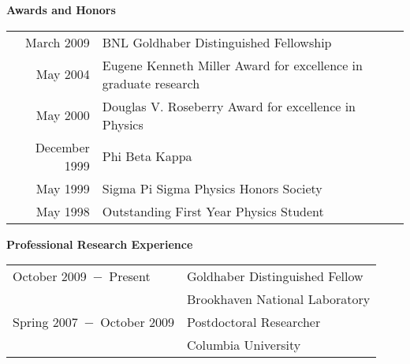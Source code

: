 \documentclass[12pt]{article}
\begin{document}
\noindent
{\Large \textbf{Awards and Honors}}

\begin{tabular}{rl}
March 2009			& BNL Goldhaber Distinguished Fellowship \\
May 2004				& Eugene Kenneth Miller Award for excellence in graduate research \\
May 2000				& Douglas V. Roseberry Award for excellence in Physics \\
December 1999	 	& Phi Beta Kappa  \\
May 1999				& Sigma Pi Sigma Physics Honors Society \\
May 1998				& Outstanding First Year Physics Student \\
\end{tabular}

\noindent
{\Large \textbf{Professional Research Experience}}

\begin{tabular}{ll}
October 2009~$-$~Present			&	Goldhaber Distinguished Fellow \\
								&	Brookhaven National Laboratory \\
Spring 2007~$-$~October 2009		&	Postdoctoral Researcher \\
								&	Columbia University \\
\end{tabular}


\newpage
\pagestyle{myheadings}
\topskip=0.75cm
\headheight=0.75cm
\end{document}
